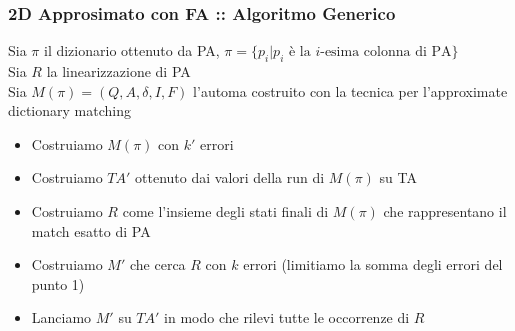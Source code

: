\documentclass{beamer}
\begin{document}
\begin{frame}
\frametitle{2D Approsimato con FA :: Algoritmo Generico}
\begin{definition}
	Sia $\pi$ il dizionario ottenuto da PA, $\pi= \{p_i | p_i \text{ è la } i \text{-esima colonna di PA}\}$\\
	Sia $R$ la linearizzazione di PA\\
	Sia $M(\pi) = (Q,A,\delta,I,F)$ l'automa costruito con la tecnica per l'approximate dictionary matching\\
\end{definition}
\begin{itemize}
\item Costruiamo $M(\pi)$ con $k'$ errori 
\item Costruiamo $TA'$ ottenuto dai valori della run di $M(\pi)$ su TA
\item Costruiamo $R$ come l'insieme degli stati finali di $M(\pi)$ che rappresentano il match esatto di PA
\item Costruiamo $M'$ che cerca $R$ con $k$ errori (limitiamo la somma degli errori del punto 1)
\item Lanciamo $M'$ su $TA'$ in modo che rilevi tutte le occorrenze di $R$
\end{itemize}

\end{frame}
\end{document}
